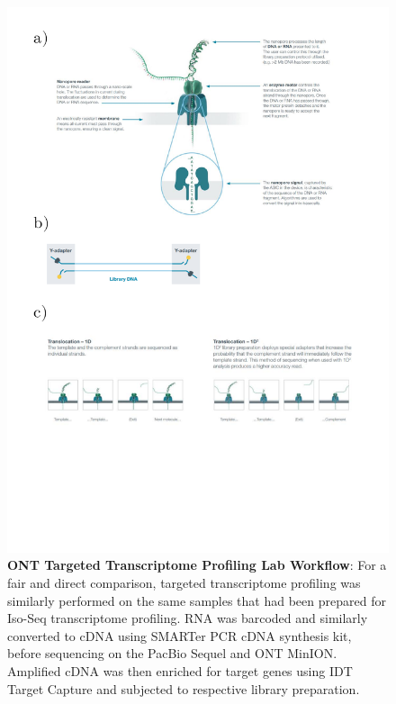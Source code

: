 \begin{figure}[]
	\centering
	\includegraphics[page=7,trim={0 5cm 0 0 },clip, scale = 0.7]{Figures/ProjectDevelopment_FiguresONT}
	\captionsetup{width=0.95\textwidth}
	\caption[ONT Targeted Transcriptome Profiling Lab Workflow]%
	{\textbf{ONT Targeted Transcriptome Profiling Lab Workflow}: For a fair and direct comparison, targeted transcriptome profiling was similarly performed on the same samples that had been prepared for Iso-Seq transcriptome profiling. RNA was barcoded and similarly converted to cDNA using SMARTer PCR cDNA synthesis kit, before sequencing on the PacBio Sequel and ONT MinION. Amplified cDNA was then enriched for target genes using IDT Target Capture and subjected to respective library preparation.}
	\label{fig:ONT_TargetedProtocol}
\end{figure}


